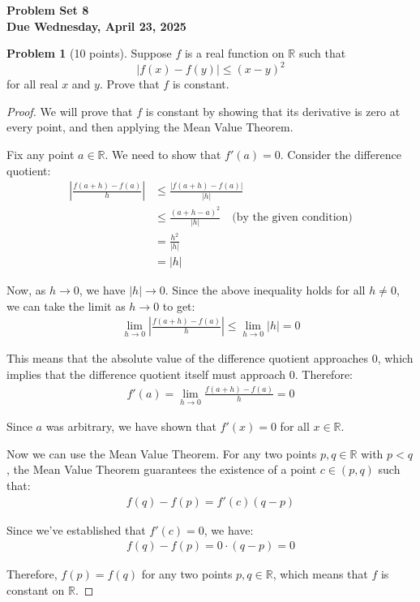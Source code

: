 \documentclass[12pt,oneside]{article}
\theoremstyle{definition}
\newtheorem{problem}{Problem}
\begin{document}
\pagestyle{fancy}

\begin{center}
\bf \Large
Problem Set 8 \\[0.5 em]
\large
Due Wednesday, April 23, 2025
\end{center}

\bigskip


\begin{problem}[10 points]
Suppose $f$ is a real function on $\mathbb{R}$ such that
\[
|f(x) - f(y)| \leq (x-y)^2
\]
for all real $x$ and $y$. 
Prove that $f$ is constant. 
\end{problem}

\begin{proof}
We will prove that $f$ is constant by showing that its derivative is zero at every point, and then applying the Mean Value Theorem.

Fix any point $a \in \mathbb{R}$. We need to show that $f'(a) = 0$. Consider the difference quotient:
\begin{align}
\left|\frac{f(a+h) - f(a)}{h}\right| &\leq \frac{|f(a+h) - f(a)|}{|h|} \\
&\leq \frac{(a+h-a)^2}{|h|} \quad \text{(by the given condition)} \\
&= \frac{h^2}{|h|} \\
&= |h|
\end{align}

Now, as $h \to 0$, we have $|h| \to 0$. Since the above inequality holds for all $h \neq 0$, we can take the limit as $h \to 0$ to get:
\begin{align}
\lim_{h \to 0} \left|\frac{f(a+h) - f(a)}{h}\right| \leq \lim_{h \to 0} |h| = 0
\end{align}

This means that the absolute value of the difference quotient approaches 0, which implies that the difference quotient itself must approach 0. Therefore:
\begin{align}
f'(a) = \lim_{h \to 0} \frac{f(a+h) - f(a)}{h} = 0
\end{align}

Since $a$ was arbitrary, we have shown that $f'(x) = 0$ for all $x \in \mathbb{R}$.

Now we can use the Mean Value Theorem. For any two points $p, q \in \mathbb{R}$ with $p < q$, the Mean Value Theorem guarantees the existence of a point $c \in (p, q)$ such that:
\begin{align}
f(q) - f(p) = f'(c)(q - p)
\end{align}

Since we've established that $f'(c) = 0$, we have:
\begin{align}
f(q) - f(p) = 0 \cdot (q - p) = 0
\end{align}

Therefore, $f(p) = f(q)$ for any two points $p, q \in \mathbb{R}$, which means that $f$ is constant on $\mathbb{R}$.
\end{proof}
\end{document}
